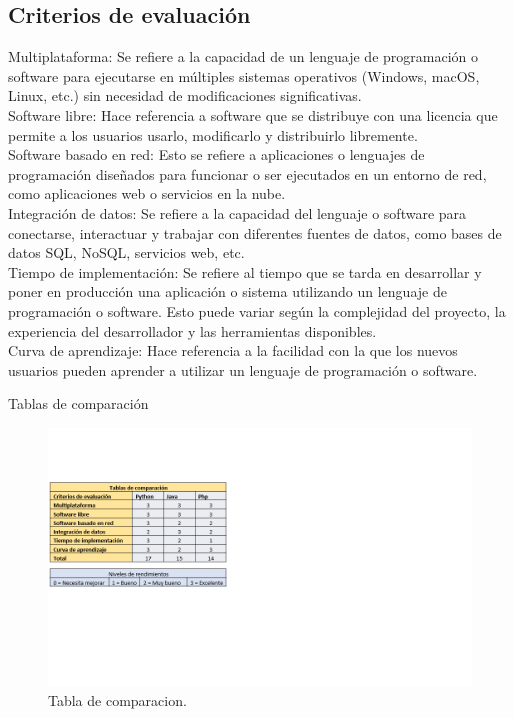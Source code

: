\subsection{Criterios de evaluación}
Multiplataforma: Se refiere a la capacidad de un lenguaje de programación o software para ejecutarse en múltiples sistemas operativos (Windows, macOS, Linux, etc.) sin necesidad de modificaciones significativas. \\
Software libre: Hace referencia a software que se distribuye con una licencia que permite a los usuarios usarlo, modificarlo y distribuirlo libremente.  \\
Software basado en red: Esto se refiere a aplicaciones o lenguajes de programación diseñados para funcionar o ser ejecutados en un entorno de red, como aplicaciones web o servicios en la nube. \\
Integración de datos: Se refiere a la capacidad del lenguaje o software para conectarse, interactuar y trabajar con diferentes fuentes de datos, como bases de datos SQL, NoSQL, servicios web, etc. \\
Tiempo de implementación: Se refiere al tiempo que se tarda en desarrollar y poner en producción una aplicación o sistema utilizando un lenguaje de programación o software. Esto puede variar según la complejidad del proyecto, la experiencia del desarrollador y las herramientas disponibles. \\
Curva de aprendizaje: Hace referencia a la facilidad con la que los nuevos usuarios pueden aprender a utilizar un lenguaje de programación o software. 

Tablas de comparación \\
\begin{figure}[H]
    \begin{center}
    \includegraphics[scale = 1.1]{./images/Tablas de comparacion.png}
    \caption{Tabla de comparacion.}
    \label{fig:huella}
    \end{center}
    \end{figure}

